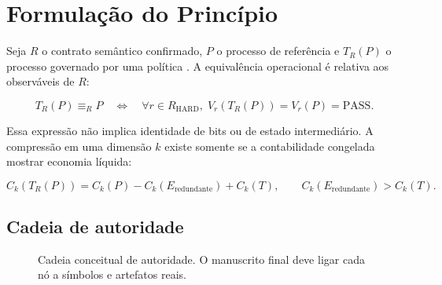 \chapter{Formulação do Princípio}
\label{chap:formulacao}

Seja $R$ o contrato semântico confirmado, $P$ o processo de referência e
$T_R(P)$ o processo governado por uma política \LangT. A equivalência
operacional é relativa aos observáveis de $R$:

\begin{equation}
  T_R(P) \equiv_R P
  \quad\Longleftrightarrow\quad
  \forall r \in R_{\mathrm{HARD}},\;
  V_r\!\left(T_R(P)\right)=V_r(P)=\mathrm{PASS}.
  \label{eq:equivalencia}
\end{equation}

Essa expressão não implica identidade de bits ou de estado intermediário. A
compressão em uma dimensão $k$ existe somente se a contabilidade congelada
mostrar economia líquida:

\begin{equation}
  C_k\!\left(T_R(P)\right)
  = C_k(P)-C_k(E_{\mathrm{redundante}})+C_k(T),
  \qquad C_k(E_{\mathrm{redundante}})>C_k(T).
  \label{eq:compressao}
\end{equation}

\section{Cadeia de autoridade}

\begin{figure}[htbp]
\centering
{}
\caption{Cadeia conceitual de autoridade. O manuscrito final deve ligar cada
nó a símbolos e artefatos reais.}
\label{fig:cadeia}
\end{figure}
